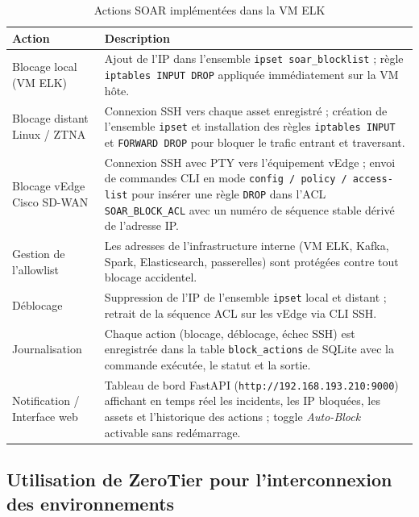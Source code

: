 \documentclass[12pt,a4paper,oneside]{report}
\begin{document}
	
	\begin{table}[H]
		\centering
		\renewcommand{\arraystretch}{1.2}
		\begin{tabular}{|p{}|p{}|}
			\hline
			\textbf{Action} & \textbf{Description} \\
			\hline
			Blocage local (VM ELK) &
			Ajout de l'IP dans l'ensemble \texttt{ipset soar\_blocklist} ;
			règle \texttt{iptables INPUT DROP} appliquée immédiatement sur la VM hôte. \\
			\hline
			Blocage distant Linux / ZTNA &
			Connexion SSH vers chaque asset enregistré ; création de l'ensemble
			\texttt{ipset} et installation des règles \texttt{iptables INPUT} et
			\texttt{FORWARD DROP} pour bloquer le trafic entrant et traversant. \\
			\hline
			Blocage vEdge Cisco SD-WAN &
			Connexion SSH avec PTY vers l'équipement vEdge ; envoi de commandes CLI
			en mode \texttt{config / policy / access-list} pour insérer une règle
			\texttt{DROP} dans l'ACL \texttt{SOAR\_BLOCK\_ACL} avec un numéro de
			séquence stable dérivé de l'adresse IP. \\
			\hline
			Gestion de l'allowlist &
			Les adresses de l'infrastructure interne (VM ELK, Kafka, Spark,
			Elasticsearch, passerelles) sont protégées contre tout blocage accidentel. \\
			\hline
			Déblocage &
			Suppression de l'IP de l'ensemble \texttt{ipset} local et distant ;
			retrait de la séquence ACL sur les vEdge via CLI SSH. \\
			\hline
			Journalisation &
			Chaque action (blocage, déblocage, échec SSH) est enregistrée dans la
			table \texttt{block\_actions} de SQLite avec la commande exécutée,
			le statut et la sortie. \\
			\hline
			Notification / Interface web &
			Tableau de bord FastAPI (\texttt{http://192.168.193.210:9000}) affichant
			en temps réel les incidents, les IP bloquées, les assets et l'historique
			des actions ; toggle \textit{Auto-Block} activable sans redémarrage. \\
			\hline
		\end{tabular}
		\caption{Actions SOAR implémentées dans la VM ELK}
		\label{tab:actions-soar-vm-elk}
	\end{table}
	
	\subsection{Utilisation de ZeroTier pour l'interconnexion des environnements}
	
\end{document}
